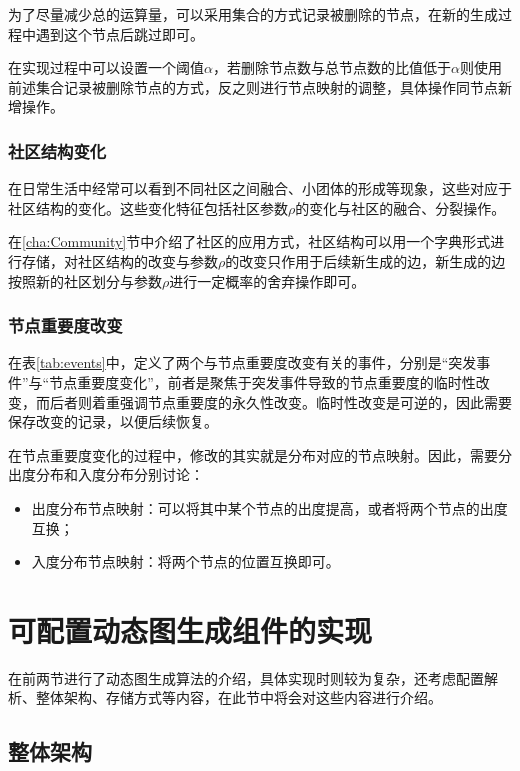 为了尽量减少总的运算量，可以采用集合的方式记录被删除的节点，在新的生成过程中遇到这个节点后跳过即可。

在实现过程中可以设置一个阈值$\alpha$，若删除节点数与总节点数的比值低于$\alpha$则使用前述集合记录被删除节点的方式，反之则进行节点映射的调整，具体操作同节点新增操作。

\subsubsection{社区结构变化}

在日常生活中经常可以看到不同社区之间融合、小团体的形成等现象，这些对应于社区结构的变化。这些变化特征包括社区参数$\rho$的变化与社区的融合、分裂操作。

在\ref{cha:Community}节中介绍了社区的应用方式，社区结构可以用一个字典形式进行存储，对社区结构的改变与参数$\rho$的改变只作用于后续新生成的边，新生成的边按照新的社区划分与参数$\rho$进行一定概率的舍弃操作即可。

\subsubsection{节点重要度改变}

在表\ref{tab:events}中，定义了两个与节点重要度改变有关的事件，分别是“突发事件”与“节点重要度变化”，前者是聚焦于突发事件导致的节点重要度的临时性改变，而后者则着重强调节点重要度的永久性改变。临时性改变是可逆的，因此需要保存改变的记录，以便后续恢复。

在节点重要度变化的过程中，修改的其实就是分布对应的节点映射。因此，需要分出度分布和入度分布分别讨论：

\begin{itemize}
  \item 出度分布节点映射：可以将其中某个节点的出度提高，或者将两个节点的出度互换；
  \item 入度分布节点映射：将两个节点的位置互换即可。
\end{itemize}

\vspace{0.2cm}

\section{可配置动态图生成组件的实现}
\label{cha:tool_implementation}

在前两节进行了动态图生成算法的介绍，具体实现时则较为复杂，还考虑配置解析、整体架构、存储方式等内容，在此节中将会对这些内容进行介绍。

\subsection{整体架构}


